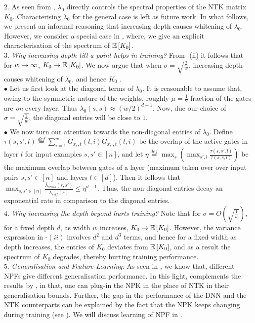 $2.$ As seen from , $\lambda_0$ directly controls the spectral properties of the NTK matrix $K_0$. Characterising $\lambda_0$ for the general case is left as future work. In what follows, we present an informal reasoning that increasing depth causes whitening of $\lambda_0$. However, we consider a special case in , where, we give an explicit characterisation of the spectrum of $\mathbb{E}\left[K_0\right]$.\\
$3.$ \emph{Why increasing depth till a point helps in training? } From -(ii) it follows that for $w\rightarrow\infty$, $K_0\rightarrow\mathbb{E}\left[K_0\right]$. We now argue that when $\sigma=\sqrt{\frac{2}{w}}$, increasing depth causes whitening of $\lambda_0$, and hence $K_0$ .\hfill\\
$\bullet$ Let us first look at the diagonal terms of $\lambda_0$. It is reasonable to assume that, owing to the symmetric nature of the weights, roughly $\mu=\frac{1}{2}$ fraction of the gates are \emph{on} every layer. Thus $\lambda_0(s,s)\approx (w/2)^{d-1}$. Now, due our choice of $\sigma=\sqrt{\frac{2}{w}}$, the diagonal entries will be close to $1$.\hfill\\
$\bullet$ We now turn our attention towards the non-diagonal entries of $\lambda_0$. Define $\tau(s,s',l)\stackrel{def}=\sum_{i=1}^w G_{x_s,t}(l,i)G_{x_{s'},t}(l,i)$ be the overlap of the active gates in layer $l$ for input examples $s,s'\in[n]$, and  let $\eta\stackrel{def}=\max_s\left(\max_{s',l} \frac{\tau(s,s',l)}{\tau(s,s,l)}\right)$ be the maximum overlap between gates of a layer (maximum taken over over input pairs $s,s'\in[n]$ and layers $l\in [d]$).  Then it follows that $\max_{s,s'\in [n]} \frac{\bar{\lambda}_{cross}(s,s')}{\bar{\lambda}_{self}(s)}\leq \eta^{d-1}$. Thus, the non-diagonal entries decay an exponential rate in comparison to the diagonal entries.\hfill\\
$4.$ \emph{Why increasing the depth beyond hurts training?} Note that for $\sigma=O\left(\sqrt{\frac{1}{w}}\right)$, for a fixed depth $d$, as width $w$ increases, $K_0\rightarrow\mathbb{E}\left[K_0\right]$. However, the variance expression in -$(ii)$ involves $d^2$ and $d^3$ terms, and hence for a fixed width as depth increases, the entries of $K_0$ deviates from $\mathbb{E}\left[K_0\right]$, and as a result the spectrum of $K_0$ degrades, thereby hurting training performance.\\
$5.$ \emph{Generalisation and Feature Learning:} As seen in , we know that, different NPFs give different generalisation performance. In this light,  complements the results by \cite{arora2019exact,cao2019generalization}, in that, one can plug-in the NPK in the place of NTK in their generalisation bounds. Further, the gap in the performance of the DNN and the NTK counterparts can be explained by the fact that the NPK keeps changing during training (see ). We will discuss learning of NPF in .\\
